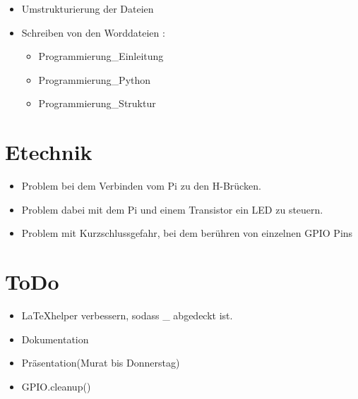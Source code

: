 \documentclass{article}
\begin{document}
\begin{itemize}

\item Umstrukturierung der Dateien

\item Schreiben von den Worddateien :
\begin{itemize}

\item Programmierung\_Einleitung

\item Programmierung\_Python

\item Programmierung\_Struktur

\end{itemize} 

\end{itemize}

\section{Etechnik}

\begin{itemize}

\item Problem bei dem Verbinden vom Pi zu den H-Brücken.

\item Problem dabei mit dem Pi und einem Transistor ein LED zu steuern.


\item Problem mit Kurzschlussgefahr, bei dem berühren von einzelnen GPIO Pins

\end{itemize}

\section{ToDo}

\begin{itemize}

\item \LaTeX helper verbessern, sodass \_ abgedeckt ist.

\item Dokumentation 

\item Pr\"{a}sentation(Murat bis Donnerstag)

\item GPIO.cleanup()

\end{itemize}
\end{document}
